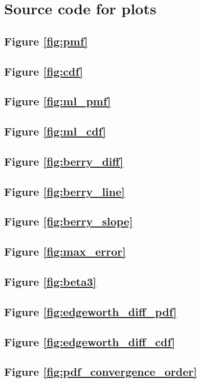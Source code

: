 \chapter{Source code for plots}

\newcommand*{\src}[1]{\section{Figure \ref{fig:#1}}

}

\src{pmf}
\src{cdf}
\src{ml_pmf}
\src{ml_cdf}
\src{berry_diff}
\src{berry_line}
\src{berry_slope}
\src{max_error}
\src{beta3}
\src{edgeworth_diff_pdf}
\src{edgeworth_diff_cdf}
\src{pdf_convergence_order}
